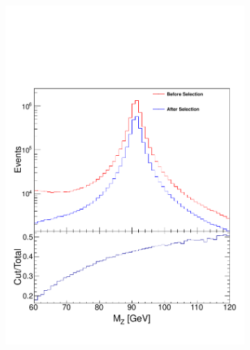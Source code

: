 \begin{figure}[!p]
    \centering
    \begin{subfigure}[b]{\SideBySidePlotWidth}
        \includegraphics[width=\linewidth]{figures/DataAnaStrat/MassMCCompPlot.pdf}
        \caption{}
    \end{subfigure}%
    \begin{subfigure}[b]{\SideBySidePlotWidth}

\end{subfigure}
\end{figure}
